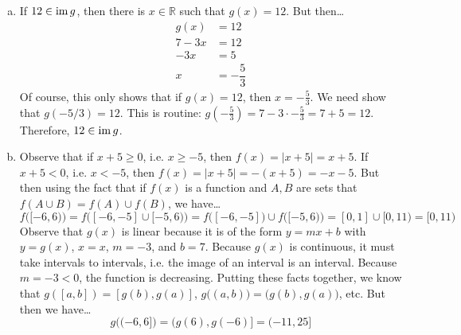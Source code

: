 \documentclass[12pt,letterpaper]{exam}
\begin{document}
\begin{questions}
{\begin{enumerate}[(a)]
\item If $12 \in \operatorname{im} g$, then there is $x \in \mathbb{R}$ such that $g(x)= 12$. But then\dots
	\[
	\begin{aligned}
	g(x)&= 12 \\
	7 - 3x&= 12 \\
	-3x&= 5 \\
	x&= -\dfrac{5}{3}
	\end{aligned}
	\]
Of course, this only shows that if $g(x)= 12$, then $x= -\frac{5}{3}$. We need show that $g(-5/3)= 12$. This is routine: $g \left(-\frac{5}{3} \right)= 7 - 3 \cdot -\frac{5}{3}= 7 + 5= 12$. Therefore, $12 \in \operatorname{im} g$. \pspace

\item Observe that if $x + 5 \geq 0$, i.e. $x \geq -5$, then $f(x)= |x + 5|= x + 5$. If $x + 5 < 0$, i.e. $x < -5$, then $f(x)= |x + 5|= -(x + 5)= -x - 5$. But then using the fact that if $f(x)$ is a function and $A, B$ are sets that $f(A \cup B)= f(A) \cup f(B)$, we have\dots
	\[
	f \big( [-6, 6) \big)= f \big( [-6, -5] \cup [-5, 6) \big)= f \big([-6, -5] \big) \cup f \big( [-5, 6) \big)= [0, 1] \cup [0, 11)= [0, 11)
	\]
Observe that $g(x)$ is linear because it is of the form $y= mx + b$ with $y= g(x)$, $x= x$, $m= -3$, and $b= 7$. Because $g(x)$ is continuous, it must take intervals to intervals, i.e. the image of an interval is an interval.  Because $m= -3 < 0$, the function is decreasing. Putting these facts together, we know that $g([a, b])= [g(b), g(a)]$, $g \big( (a, b) \big)= \big( g(b), g(a) \big)$, etc. But then we have\dots
	\[
	g\big( (-6, 6] \big)= (g(6), g(-6)]= (-11, 25]
	\]


\end{enumerate}}
\end{questions}
\end{document}
